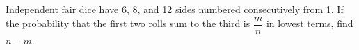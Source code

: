 Independent fair dice have 6, 8, and 12 sides numbered consecutively from 1. If the probability that the first two rolls sum to the third is $\dfrac{m}{n}$ in lowest terms, find $n-m$.
